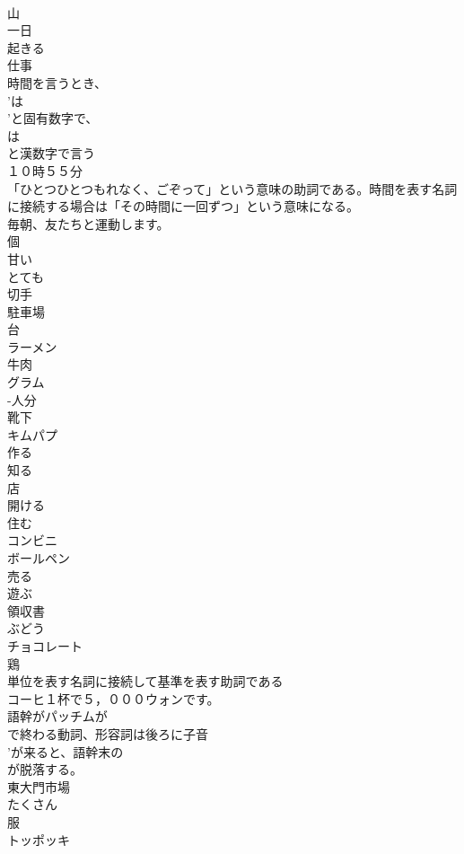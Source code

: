 \documentclass[8pt]{extreport}
\begin{document}
\begin{CJK}{UTF8}{min}
\\	山
\\	一日
\\	起きる
\\	仕事
\\	時間を言うとき、
\\	'は
\\	'と固有数字で、
\\	は　
\\	と漢数字で言う	
\\	１０時５５分
\\	「ひとつひとつもれなく、ごぞって」という意味の助詞である。時間を表す名詞に接続する場合は「その時間に一回ずつ」という意味になる。	
\\	毎朝、友たちと運動します。
\\	個
\\	甘い
\\	とても
\\	切手
\\	駐車場
\\	台
\\	ラーメン
\\	牛肉
\\	グラム
\\	-人分
\\	靴下
\\	キムパプ
\\	作る
\\	知る
\\	店
\\	開ける
\\	住む
\\	コンビニ
\\	ボールペン
\\	売る
\\	遊ぶ
\\	領収書
\\	ぶどう
\\	チョコレート
\\	鶏
\\	単位を表す名詞に接続して基準を表す助詞である	
\\	コーヒ１杯で５，０００ウォンです。
\\	語幹がパッチムが
\\	で終わる動詞、形容詞は後ろに子音
\\	'が来ると、語幹末の 
\\	が脱落する。	
\\	東大門市場
\\	たくさん
\\	服
\\	トッポッキ

\end{CJK}
\end{document}

